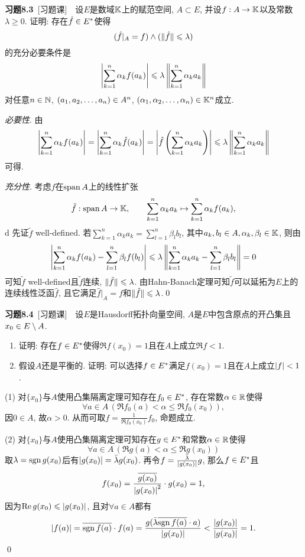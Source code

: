 	\textbf{习题8.3}\ [习题课]\ \ 设$ E $是数域$ \mathbb{K} $上的赋范空间, $ A\subset E $, 并设$ f : A\to\mathbb{K} $以及常数$ \lambda\geqslant 0 $. 证明: 存在$ \hat{f}\in E^{*} $使得
	\[
	(\hat{f}\rvert_A=f)\land (\lVert \hat{f}\rVert\leqslant\lambda)
	\]
	的充分必要条件是
	\[
	\left| \sum_{k=1}^n\alpha_kf(a_k) \right| \leqslant\lambda\left\| \sum_{k=1}^n\alpha_ka_k \right\|
	\]
	对任意$ n\in\mathbb{N} $, $ (a_{1}, a_{2}, \dots, a_{n})\in A^n $, $ (\alpha_{1}, \alpha_{2}, \dots, \alpha_{n})\in\mathbb{K}^n $成立.
	\begin{Proof}
	\textsl{必要性}. 由
	\[
	\left| \sum_{k=1}^n\alpha_kf(a_k) \right| =\left| \sum_{k=1}^n\alpha_k\hat{f}(a_k) \right| =\left| \hat{f}\left( \sum_{k=1}^n\alpha_ka_k \right) \right| \leqslant\lambda\left\| \sum_{k=1}^n\alpha_ka_k \right\|
	\]
	可得.
	
	\textsl{充分性}. 考虑$ f $在$ \operatorname{span} A $上的线性扩张
	\[
	\tilde{f} : \operatorname{span} A\to\mathbb{K},\qquad \sum_{k=1}^n\alpha_ka_k\mapsto\sum_{k=1}^n\alpha_kf(a_k),
	\]d
	先证$ \tilde{f} $ well-defined. 若$ \sum\limits_{k=1}^n\alpha_ka_k=\sum\limits_{l=1}^n\beta_lb_l $, 其中$ a_k, b_l\in A, \alpha_{k}, \beta_{l}\in\mathbb{K} $, 则由
	\[
	\left| \sum_{k=1}^n\alpha_kf(a_k)-\sum_{l=1}^n\beta_lf(b_l) \right| \leqslant\lambda\left\| \sum_{k=1}^n\alpha_ka_k-\sum_{l=1}^n\beta_lb_l \right\|=0
	\]
	可知$ \tilde{f} $ well-defined且$ \tilde{f} $连续, $ \lVert \tilde{f}\rVert\leqslant\lambda $. 由Hahn-Banach定理可知$ \tilde{f} $可以延拓为$ E $上的连续线性泛函$ \hat{f} $, 且它满足$ \hat{f}\rvert_A=f $和$ \lVert \hat{f}\rVert\leqslant\lambda $.\qed
	\end{Proof}
	
	\textbf{习题8.4}\ [习题课]\ \ 设$ E $是Hausdorff拓扑向量空间, $ A $是$ E $中包含原点的开凸集且$ x_0\in E\setminus A $.
	\begin{enumerate}[(1)]
	\item 证明: 存在$ f\in E^{*} $使得$ \Re f(x_0)=1 $且在$ A $上成立$ \Re f<1 $.
	\item 假设$ A $还是平衡的. 证明: 可以选择$ f\in E^{*} $满足$ f(x_0)=1 $且在$ A $上成立$ \left| f \right| <1 $.
	\end{enumerate}
	\begin{Proof}
	(1) 对$ \{x_0\} $与$ A $使用凸集隔离定理可知存在$ f_0\in E^{*} $, 存在常数$ \alpha\in\mathbb{R} $使得
	\[
	\forall a\in A\,(\Re f_0(a)<\alpha\leqslant\Re f_0(x_0)),
	\]
	因$ 0\in A $, 故$ \alpha>0 $. 从而可取$ f=\frac{1}{\Re f_0(x_0)}f_0 $, 命题成立.
	
	(2) 对$ \{ x_0 \} $与$ A $使用凸集隔离定理可知存在$ g\in E^{*} $和常数$ \alpha\in\mathbb{R} $使得
	\[
	\forall a\in A\,(\Re g(a)<\alpha\leqslant\Re g(x_0))
	\]
	取$ \lambda=\mathrm{sgn}\, g(x_0) $后有$ \left| g(x_0) \right| =\bar{\lambda}g(x_0) $. 再令$ f=\frac{\bar{\lambda}}{\left| g(x_0) \right| }g $, 那么$ f\in E^{*} $且
	\[
	f(x_0)=\frac{\overline{g(x_0)}}{\left| g(x_0) \right| ^2}\cdot g(x_0)=1,
	\]
	因为$ \mathrm{Re\,} g(x_0)\leqslant\left| g(x_0) \right|  $, 且对$ \forall a\in A $都有
	\[
	\left| f(a) \right| =\overline{\mathrm{sgn}\, f(a)}\cdot f(a)=\frac{g(\bar{\lambda}\overline{\mathrm{sgn}\, f(a)}\cdot a)}{\left| g(x_0) \right| }<\frac{\left| g(x_0) \right| }{\left| g(x_0) \right| }=1.
	\]
	\qed
	\end{Proof}
	
